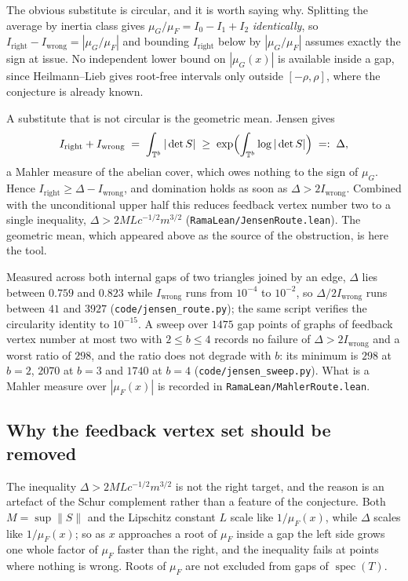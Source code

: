 \documentclass[11pt]{article}
\theoremstyle{remark}
\begin{document}
The obvious substitute is circular, and it is worth saying why. Splitting the average by
inertia class gives $\mu_G/\mu_F=I_0-I_1+I_2$ \emph{identically}, so
$I_{\mathrm{right}}-I_{\mathrm{wrong}}=|\mu_G/\mu_F|$ and bounding $I_{\mathrm{right}}$
below by $|\mu_G/\mu_F|$ assumes exactly the sign at issue. No independent lower bound on
$|\mu_G(x)|$ is available inside a gap, since Heilmann--Lieb gives root-free intervals only
outside $[-\rho,\rho]$, where the conjecture is already known.

A substitute that is not circular is the geometric mean. Jensen gives
\[
   I_{\mathrm{right}}+I_{\mathrm{wrong}}\;=\;\int_{\mathbb T^b}|\det S|\;\ge\;
   \exp\Bigl(\int_{\mathbb T^b}\log|\det S|\Bigr)\;=:\;\Delta ,
\]
a Mahler measure of the abelian cover, which owes nothing to the sign of $\mu_G$. Hence
$I_{\mathrm{right}}\ge\Delta-I_{\mathrm{wrong}}$, and domination holds as soon as
$\Delta>2I_{\mathrm{wrong}}$. Combined with the unconditional upper half this reduces
feedback vertex number two to a single inequality, $\Delta>2ML c^{-1/2}m^{3/2}$
(\texttt{RamaLean/JensenRoute.lean}). The geometric mean, which appeared above as the source
of the obstruction, is here the tool.

Measured across both internal gaps of two triangles joined by an edge, $\Delta$ lies between
$0.759$ and $0.823$ while $I_{\mathrm{wrong}}$ runs from $10^{-4}$ to $10^{-2}$, so
$\Delta/2I_{\mathrm{wrong}}$ runs between $41$ and $3927$
(\texttt{code/jensen\_route.py}); the same script verifies the circularity identity to
$10^{-15}$. A sweep over $1475$ gap points of graphs of feedback vertex number at most two
with $2\le b\le4$ records no failure of $\Delta>2I_{\mathrm{wrong}}$ and a worst ratio of
$298$, and the ratio does not degrade with $b$: its minimum is $298$ at $b=2$, $2070$ at
$b=3$ and $1740$ at $b=4$ (\texttt{code/jensen\_sweep.py}). What is a Mahler measure over
$|\mu_F(x)|$ is recorded in \texttt{RamaLean/MahlerRoute.lean}.

\subsection{Why the feedback vertex set should be removed}\label{sec:parity}

The inequality $\Delta>2MLc^{-1/2}m^{3/2}$ is not the right target, and the reason is an
artefact of the Schur complement rather than a feature of the conjecture. Both $M=\sup\|S\|$
and the Lipschitz constant $L$ scale like $1/\mu_F(x)$, while $\Delta$ scales like
$1/\mu_F(x)$; so as $x$ approaches a root of $\mu_F$ inside a gap the left side grows one
whole factor of $\mu_F$ faster than the right, and the inequality fails at points where
nothing is wrong. Roots of $\mu_F$ are not excluded from gaps of $\operatorname{spec}(T)$.
\end{document}
